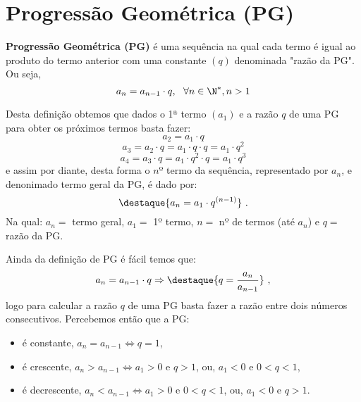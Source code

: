 \section{Progressão Geométrica (PG)}

 \colorbox{azul}{
 \begin{minipage}{14.5cm}
 \begin{center}
  \textbf{Progressão Geométrica (PG)} é uma sequência na qual cada termo é igual ao produto do termo anterior com uma constante $(q)$ denominada "razão da PG". Ou seja,
  \[a_{n}= a_{n-1} \cdot q, \ \ \forall n \in \N^{\ast}, n > 1\]
 \end{center}
 \end{minipage}}
 \vskip0.3cm

 Desta definição obtemos que dados o 1ª termo $(a_1)$ e a razão $q$ de uma PG para obter os próximos termos basta fazer:
 \[a_2= a_1 \cdot q\]
 \[a_3= a_2 \cdot q= a_1 \cdot q \cdot q= a_1 \cdot q^2\]
 \[a_4= a_3 \cdot q= a_1 \cdot q^2 \cdot q= a_1 \cdot q^3 \]
 e assim por diante, desta forma o $nº$ termo da sequência, representado por $a_n$, e denonimado termo geral da PG, é dado por:
 \[\destaque{a_n= a_1 \cdot q^{(n-1)}} \ .\]
 Na qual: $a_n=$ termo geral, $a_1=$ 1º termo, $n=$ nº de termos (até $a_n$) e $q=$ razão da PG.

 Ainda da definição de PG é fácil temos que:
 \[a_{n}= a_{n-1} \cdot q \Rightarrow
 \destaque{q= \frac{a_{n}}{ a_{n-1}}} \ ,\]
 logo para calcular a razão $q$ de uma PG basta fazer a razão entre dois números consecutivos. Percebemos então que a PG:
 \begin{itemize}
  \item é constante, $a_n= a_{n-1} \Leftrightarrow q= 1$,
  \item é crescente, $a_n > a_{n-1} \Leftrightarrow a_1 > 0$ e $q > 1$, ou, $a_1 < 0$ e $0 < q < 1$,
  \item é decrescente, $a_n < a_{n-1} \Leftrightarrow a_1 > 0$ e $0 < q < 1$, ou, $a_1 < 0$ e $q > 1$.
 \end{itemize}

